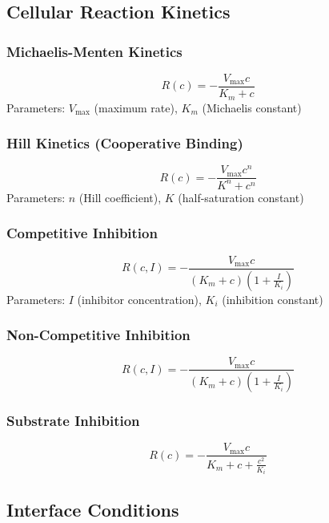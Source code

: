 \documentclass[11pt,a4paper]{article}
\begin{document}
\subsection{Cellular Reaction Kinetics}

\subsubsection{Michaelis-Menten Kinetics}
\begin{equation}
R(c) = -\frac{V_{\max} c}{K_m + c}
\end{equation}
Parameters: $V_{\max}$ (maximum rate), $K_m$ (Michaelis constant)

\subsubsection{Hill Kinetics (Cooperative Binding)}
\begin{equation}
R(c) = -\frac{V_{\max} c^n}{K^n + c^n}
\end{equation}
Parameters: $n$ (Hill coefficient), $K$ (half-saturation constant)

\subsubsection{Competitive Inhibition}
\begin{equation}
R(c,I) = -\frac{V_{\max} c}{(K_m + c)\left(1 + \frac{I}{K_i}\right)}
\end{equation}
Parameters: $I$ (inhibitor concentration), $K_i$ (inhibition constant)

\subsubsection{Non-Competitive Inhibition}
\begin{equation}
R(c,I) = -\frac{V_{\max} c}{(K_m + c)\left(1 + \frac{I}{K_i}\right)}
\end{equation}

\subsubsection{Substrate Inhibition}
\begin{equation}
R(c) = -\frac{V_{\max} c}{K_m + c + \frac{c^2}{K_i}}
\end{equation}

\subsection{Interface Conditions}
\end{document}
